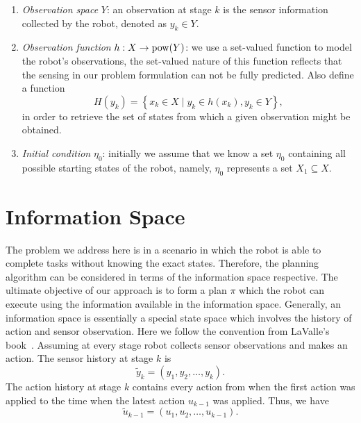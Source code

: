\begin{enumerate}
\item \emph{Observation space} $Y$: an observation at stage $k$ is the sensor
  information collected by the robot, denoted as $y_k \in Y$.
\item \emph{Observation function} $h : X \to \operatorname{pow}(Y) $: we use a set-valued
  function to model the robot's observations, the set-valued nature of this function reflects
  that the sensing in our problem formulation can not be fully predicted. Also
  define a function
  \begin{equation}
    \label{eq:preimage}
    H(y_k) = \left\{ x_k \in X \mid y_k \in h(x_k), y_k \in Y \right\},
  \end{equation}
  in order to retrieve the set of states from which a given observation might be obtained.
\item \emph{Initial condition} $\eta_0$: initially we assume that we know a set
  $\eta_0$ containing all possible starting states of the robot, namely,
  $\eta_0$ represents a set $X_1\subseteq X$. 
\end{enumerate}

\section{Information Space}
\label{sec:ispace}
The problem we address here is in a scenario in which the robot is able to complete
tasks without knowing the exact states. 
%
Therefore, the planning algorithm can be considered in terms of the information space respective.  
%
The ultimate objective of our approach is to form a plan $\pi$ which the robot can execute using the
information available in the information space.
%
Generally, an information space is essentially a special state space which involves the history of action and sensor observation. 
%
Here we follow the convention from LaValle's book~\cite{Lav06}. 
%
Assuming at every stage robot collects sensor observations and makes an action. 
The sensor history at stage $k$ is
\begin{equation}
  \label{eq:sensor-hist}
  \tilde{y}_k = (y_1, y_2, \ldots, y_k).
\end{equation}
The action history at stage $k$ contains every action from when the first action
was applied to the time when the latest action $u_{k-1}$ was applied. 
Thus, we have
\begin{equation}
  \label{eq:action-hist}
  \tilde{u}_{k-1} = (u_1, u_2, \ldots, u_{k-1}).
\end{equation}

